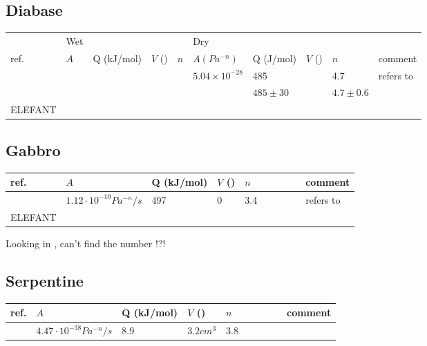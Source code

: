 \subsection{Diabase}

\begin{tabular}{|l|llll|llll|p{4cm}|}
\hline
         & Wet                   &            &        &       & Dry           &           &        &     &\\
ref.     & $A$        & Q (kJ/mol) & $V$ () & $n$   & $A (Pa^{-n})$ & Q (J/mol) & $V$ () & $n$ & comment\\
\hline\hline
\cite{cube11,grpy12} &                       &            &        &       & $5.04\times10^{-28}$ & 485 & & 4.7 & refers to \cite{mazk98}\\
\cite{mazk98} &                       &            &        &       &                     & $485\pm30$ & & $4.7\pm0.6$ & \\
\hline\hline
ELEFANT & &&&&&&&&\\
\hline
\end{tabular}



\subsection{Gabbro}

\begin{tabular}{|l|llll|llll|p{4cm}|}
\hline
ref.     & $A$        & Q (kJ/mol) & $V$ () & $n$   & &  & & & comment\\
\hline\hline
\cite{tebu12} &  $1.12\cdot10^{-10}Pa^{-n}/s$  & 497 & 0 & 3.4  &&&&& refers to \cite{wica90}\\
\hline\hline
ELEFANT & &&&&&&&&\\
\hline
\end{tabular}


Looking in \cite{wica90} , can't find the number !?!

\subsection{Serpentine}

\begin{tabular}{|l|llll|llll|p{4cm}|}
\hline
ref.     & $A$        & Q (kJ/mol) & $V$ () & $n$   & &  & & & comment\\
\hline\hline
\cite{hirw07} &  $4.47\cdot10^{-38}Pa^{-n}/s$  & 8.9 & $3.2cm^3$ & 3.8  &&&&& \\
\hline
\end{tabular}

